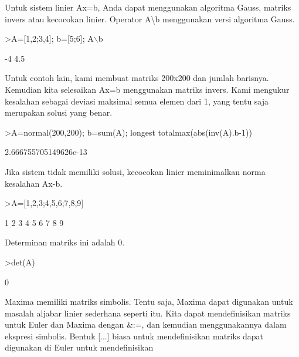 \documentclass[a4paper,10pt]{article}
\begin{document}
\begin{eulernotebook}
\begin{eulercomment}
\begin{eulercomment}
\begin{eulercomment}
\begin{eulercomment}
\begin{eulercomment}
\begin{eulercomment}
\begin{eulercomment}
Untuk sistem linier Ax=b, Anda dapat menggunakan algoritma Gauss,
matriks invers atau kecocokan linier. Operator A\textbackslash{}b menggunakan versi
algoritma Gauss.
\end{eulercomment}
\begin{eulerprompt}
>A=[1,2;3,4]; b=[5;6]; A\(\backslash\)b
\end{eulerprompt}
\begin{euleroutput}
             -4 
            4.5 
\end{euleroutput}
\begin{eulercomment}
Untuk contoh lain, kami membuat matriks 200x200 dan jumlah barisnya.
Kemudian kita selesaikan Ax=b menggunakan matriks invers. Kami
mengukur kesalahan sebagai deviasi maksimal semua elemen dari 1, yang
tentu saja merupakan solusi yang benar.
\end{eulercomment}
\begin{eulerprompt}
>A=normal(200,200); b=sum(A); longest totalmax(abs(inv(A).b-1))
\end{eulerprompt}
\begin{euleroutput}
    2.666755705149626e-13 
\end{euleroutput}
\begin{eulercomment}
Jika sistem tidak memiliki solusi, kecocokan linier meminimalkan norma
kesalahan Ax-b.
\end{eulercomment}
\begin{eulerprompt}
>A=[1,2,3;4,5,6;7,8,9]
\end{eulerprompt}
\begin{euleroutput}
              1             2             3 
              4             5             6 
              7             8             9 
\end{euleroutput}
\begin{eulercomment}
Determinan matriks ini adalah 0.
\end{eulercomment}
\begin{eulerprompt}
>det(A)
\end{eulerprompt}
\begin{euleroutput}
  0
\end{euleroutput}
\begin{eulercomment}
Maxima memiliki matriks simbolis. Tentu saja, Maxima dapat digunakan
untuk masalah aljabar linier sederhana seperti itu. Kita dapat
mendefinisikan matriks untuk Euler dan Maxima dengan \&:=, dan kemudian
menggunakannya dalam ekspresi simbolis. Bentuk [...] biasa untuk
mendefinisikan matriks dapat digunakan di Euler untuk mendefinisikan

\end{eulercomment}
\end{eulercomment}
\end{eulercomment}
\end{eulercomment}
\end{eulercomment}
\end{eulercomment}
\end{eulercomment}
\end{eulernotebook}
\end{document}
